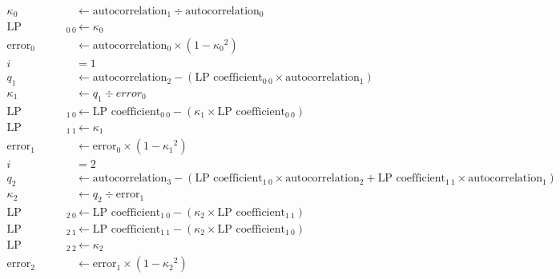 {
\begin{align*}
\kappa_0 &\leftarrow \text{autocorrelation}_1 \div \text{autocorrelation}_0 \\
\text{LP coefficient}_{0~0} &\leftarrow \kappa_0 \\
\text{error}_0 &\leftarrow \text{autocorrelation}_0 \times (1 - {\kappa_0} ^ 2) \\
i &= 1 \\
q_1 &\leftarrow \text{autocorrelation}_2 - (\text{LP coefficient}_{0~0} \times \text{autocorrelation}_{1}) \\
\kappa_1 &\leftarrow q_1 \div error_0 \\
\text{LP coefficient}_{1~0} &\leftarrow \text{LP coefficient}_{0~0} - (\kappa_1 \times \text{LP coefficient}_{0~0}) \\
\text{LP coefficient}_{1~1} &\leftarrow \kappa_1 \\
\text{error}_1 &\leftarrow \text{error}_0 \times (1 - {\kappa_1} ^ 2) \\
i &= 2 \\
q_2 &\leftarrow \text{autocorrelation}_3 - (\text{LP coefficient}_{1~0} \times \text{autocorrelation}_{2} + \text{LP coefficient}_{1~1} \times \text{autocorrelation}_{1}) \\
\kappa_2 &\leftarrow q_2 \div \text{error}_1 \\
\text{LP coefficient}_{2~0} &\leftarrow \text{LP coefficient}_{1~0} - (\kappa_2 \times \text{LP coefficient}_{1~1}) \\
\text{LP coefficient}_{2~1} &\leftarrow \text{LP coefficient}_{1~1} - (\kappa_2 \times \text{LP coefficient}_{1~0}) \\
\text{LP coefficient}_{2~2} &\leftarrow \kappa_2 \\
\text{error}_2 &\leftarrow \text{error}_1 \times (1 - {\kappa_2} ^ 2) \\
\end{align*}
}

